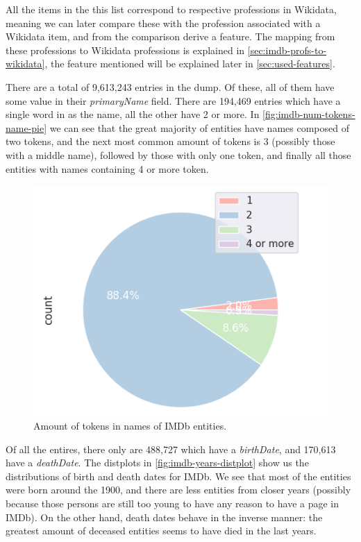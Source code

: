 \documentclass[epsfig,a4paper,11pt,titlepage,twoside,openany]{book}
\begin{document}
All the items in the this list correspond to respective professions in Wikidata, meaning we can later compare these with the profession associated with a Wikidata item, and from the comparison derive a feature. The mapping from these professions to Wikidata professions is explained in \autoref{sec:imdb-profs-to-wikidata}, the feature mentioned will be explained later in \autoref{sec:used-features}.

There are a total of 9,613,243 entries in the dump. Of these, all of them have some value in their \textit{primaryName} field. There are 194,469 entries which have a single word in as the name, all the other have 2 or more. In \autoref{fig:imdb-num-tokens-name-pie} we can see that the great majority of entities have names composed of two tokens, and the next most common amount of tokens is 3 (possibly those with a middle name), followed by those with only one token, and finally all those entities with names containing 4 or more token.

\begin{figure}[]
  \centering \includegraphics[width=.6\textwidth]{imdb_num_tokens_names}
  \caption{Amount of tokens in names of IMDb entities.}
  \label{fig:imdb-num-tokens-name-pie}
\end{figure}


Of all the entires, there only are 488,727 which have a \textit{birthDate}, and 170,613 have a \textit{deathDate}. The distplots in \autoref{fig:imdb-years-distplot} show us the distributions of birth and death dates for IMDb. We see that most of the entities were born around the 1900, and there are less entities from closer years (possibly because those persons are still too young to have any reason to have a page in IMDb). On the other hand, death dates behave in the inverse manner: the greatest amount of deceased entities seems to have died in the last years.
\end{document}
